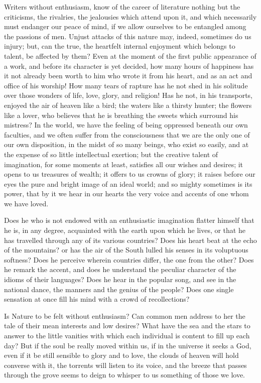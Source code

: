 Writers without enthusiasm, know of the career of literature
nothing but the criticisms, the rivalries, the jealousies which attend
upon it, and which necessarily must endanger our peace of mind, if we
allow ourselves to be entangled among the passions of men. Unjust
attacks of this nature may, indeed, sometimes do us injury; but, can
the true, the heartfelt internal enjoyment which belongs to talent, be
affected by them? Even at the moment of the first public appearance of
a work, and before its character is yet decided, how many hours of
happiness has it not already been worth to him who wrote it from his
heart, and as an act and office of his worship! How many tears of
rapture has he not shed in his solitude over those wonders of life,
love, glory, and religion! Has he not, in his transports, enjoyed the
air of heaven like a bird; the waters like a thirsty hunter; the
flowers like a lover, who believes that he is breathing the sweets
which surround his mistress? In the world, we have the feeling of
being oppressed beneath our own faculties, and we often suffer from
the consciousness that we are the only one of our own disposition, in
the midst of so many beings, who exist so easily, and at the expense
of so little intellectual exertion; but the creative talent of
imagination, for some moments at least, satisfies all our wishes and
desires; it opens to us treasures of wealth; it offers to us crowns of
glory; it raises before our eyes the pure and bright image of an ideal
world; and so mighty sometimes is its power, that by it we hear in our
hearts the very voice and accents of one whom we have loved.

Does he who is not endowed with an enthusiastic imagination flatter
himself that he is, in any degree, acquainted with the earth upon
which he lives, or that he has travelled through any of its various
countries? Does his heart beat at the echo of the mountains? or has
the air of the South lulled his senses in its voluptuous softness?
Does he perceive wherein countries differ, the one from the other?
Does he remark the accent, and does he understand the peculiar
character of the idioms of their languages? Does he hear in the
popular song, and see in the national dance, the manners and the
genius of  the people? Does one single sensation at once
fill his mind with a crowd of recollections?

Is Nature to be felt without enthusiasm? Can common men address to her
the tale of their mean interests and low desires? What have the sea
and the stars to answer to the little vanities with which each
individual is content to fill up each day? But if the soul be really
moved within us, if in the universe it seeks a God, even if it be
still sensible to glory and to love, the clouds of heaven will hold
converse with it, the torrents will listen to its voice, and the
breeze that passes through the grove seems to deign to whisper to us
something of those we love.

